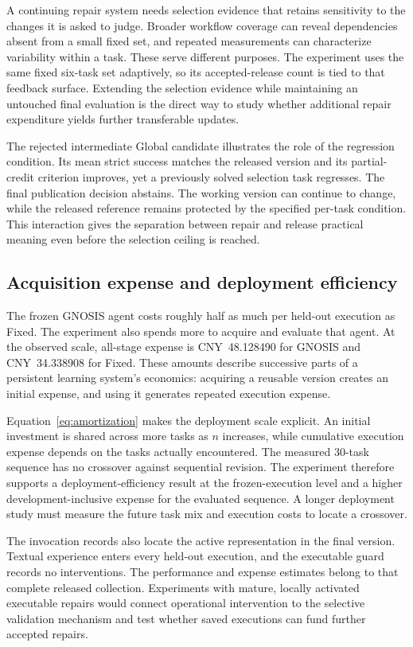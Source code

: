 \documentclass{ecai}
\begin{document}
A continuing repair system needs selection evidence that retains sensitivity to the changes it is asked to judge. Broader workflow coverage can reveal dependencies absent from a small fixed set, and repeated measurements can characterize variability within a task. These serve different purposes. The experiment uses the same fixed six-task set adaptively, so its accepted-release count is tied to that feedback surface. Extending the selection evidence while maintaining an untouched final evaluation is the direct way to study whether additional repair expenditure yields further transferable updates.

The rejected intermediate Global candidate illustrates the role of the regression condition. Its mean strict success matches the released version and its partial-credit criterion improves, yet a previously solved selection task regresses. The final publication decision abstains. The working version can continue to change, while the released reference remains protected by the specified per-task condition. This interaction gives the separation between repair and release practical meaning even before the selection ceiling is reached.

\subsection{Acquisition expense and deployment efficiency}

The frozen GNOSIS agent costs roughly half as much per held-out execution as Fixed. The experiment also spends more to acquire and evaluate that agent. At the observed scale, all-stage expense is CNY~48.128490 for GNOSIS and CNY~34.338908 for Fixed. These amounts describe successive parts of a persistent learning system's economics: acquiring a reusable version creates an initial expense, and using it generates repeated execution expense.

Equation~\eqref{eq:amortization} makes the deployment scale explicit. An initial investment is shared across more tasks as $n$ increases, while cumulative execution expense depends on the tasks actually encountered. The measured 30-task sequence has no crossover against sequential revision. The experiment therefore supports a deployment-efficiency result at the frozen-execution level and a higher development-inclusive expense for the evaluated sequence. A longer deployment study must measure the future task mix and execution costs to locate a crossover.

The invocation records also locate the active representation in the final version. Textual experience enters every held-out execution, and the executable guard records no interventions. The performance and expense estimates belong to that complete released collection. Experiments with mature, locally activated executable repairs would connect operational intervention to the selective validation mechanism and test whether saved executions can fund further accepted repairs.
\end{document}
